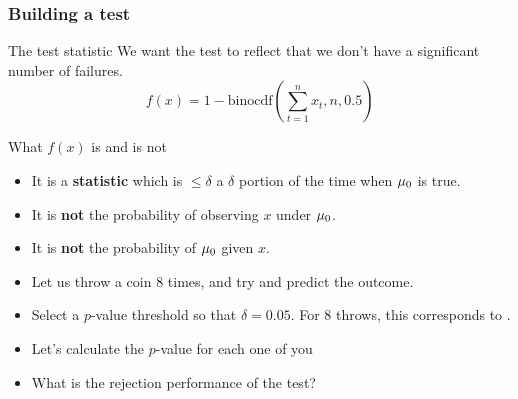{\begin{frame}
  \frametitle{Building a test}
  \begin{block}{The test statistic}
    We want the test to reflect that we don't have a significant number of failures.
    \[
    f(x) = 1 - \textrm{binocdf}(\sum_{t=1}^n x_t, n, 0.5)
    \]
  \end{block}
  \begin{alertblock}{What $f(x)$ is and is not}
    \begin{itemize}
    \item It is a \textbf{statistic} which is $\leq \delta$ a $\delta$ portion of the time when $\mu_0$ is true.
    \item It is \textbf{not} the probability of observing $x$ under $\mu_0$.
    \item It is \textbf{not} the probability of $\mu_0$ given $x$.
    \end{itemize}
  \end{alertblock}
\end{frame}
\begin{frame}
  \begin{exercise}
    \begin{itemize}
    \item<1-> Let us throw a coin 8 times, and try and predict the outcome.
    \item<2-> Select a $p$-value threshold so that $\delta = 0.05$. 
      For 8 throws, this corresponds to .
    \item<3-> Let's calculate the $p$-value for each one of you
    \item<4-> What is the rejection performance of the test?
    \end{itemize}
    \setlength{}
    \setlength{}
\end{exercise}
\end{frame}}

